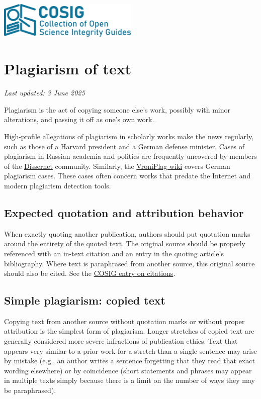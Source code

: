 \documentclass[letterpaper, 12pt]{article}
\begin{document}
\flushleft
\includegraphics[width=0.5\textwidth]{img/home/241017_final_logo_mockup.png}

\section*{Plagiarism of text}
\textit{Last updated: 3 June 2025}

Plagiarism is the act of copying someone else's work, possibly with minor alterations, and passing it off as one's own work.

High-profile allegations of plagiarism in scholarly works make the news regularly, such as those of a \href{https://www.theguardian.com/education/2024/jan/06/harvard-claudine-gay-plagiarism}{Harvard president} and a \href{https://www.bbc.com/news/world-europe-12504347}{German defense minister}. Cases of plagiarism in Russian academia and politics are frequently uncovered by members of the \href{https://dissernet.org/}{Dissernet} community. Similarly, the \href{https://vroniplag.fandom.com/de/wiki/Home}{VroniPlag wiki} covers German plagiarism cases. These cases often concern works that predate the Internet and modern plagiarism detection tools.

\subsection*{Expected quotation and attribution behavior}

When exactly quoting another publication, authors should put quotation marks around the entirety of the quoted text. The original source should be properly referenced with an in-text citation and an entry in the quoting article's bibliography. Where text is paraphrased from another source, this original source should also be cited. See the \href{https://osf.io/5vknq}{COSIG entry on citations}.

\subsection*{Simple plagiarism: copied text}

Copying text from another source without quotation marks or without proper attribution is the simplest form of plagiarism. Longer stretches of copied text are generally considered more severe infractions of publication ethics. Text that appears very similar to a prior work for a stretch than a single sentence may arise by mistake (e.g., an author writes a sentence forgetting that they read that exact wording elsewhere) or by coincidence (short statements and phrases may appear in multiple texts simply because there is a limit on the number of ways they may be paraphrased).
\end{document}
